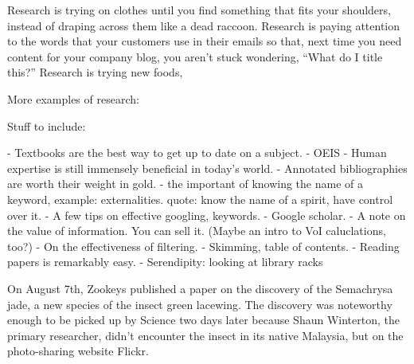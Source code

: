 Research is trying on clothes until you find something that fits your shoulders, instead of draping across them like a dead raccoon. Research is paying attention to the words that your customers use in their emails so that, next time you need content for your company blog, you aren't stuck wondering, ``What do I title this?'' Research is trying new foods, 

More examples of research:


Stuff to include:

- Textbooks are the best way to get up to date on a subject.
- OEIS
- Human expertise is still immensely beneficial in today's world.
- Annotated bibliographies are worth their weight in gold.
- the important of knowing the name of a keyword, example: externalities. quote: know the name of a spirit, have control over it.
- A few tips on effective googling, keywords.
- Google scholar.
- A note on the value of information. You can sell it. (Maybe an intro to VoI caluclations, too?)
- On the effectiveness of filtering. 
- Skimming, table of contents.
- Reading papers is remarkably easy.
- Serendipity: looking at library racks

On August 7th, Zookeys published a paper on the discovery of the Semachrysa jade, a new species of the insect green lacewing. The discovery was noteworthy enough to be picked up by Science two days later because Shaun Winterton, the primary researcher, didn’t encounter the insect in its native Malaysia, but on the photo-sharing website Flickr.
